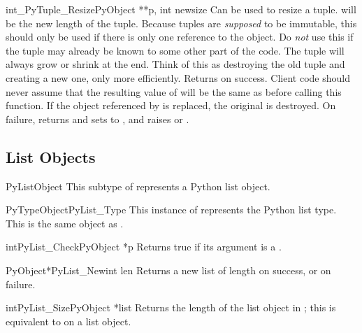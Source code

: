 \begin{cfuncdesc}{int}{_PyTuple_Resize}{PyObject **p, int newsize}
  Can be used to resize a tuple.   will be the new length
  of the tuple.  Because tuples are \emph{supposed} to be immutable,
  this should only be used if there is only one reference to the
  object.  Do \emph{not} use this if the tuple may already be known to
  some other part of the code.  The tuple will always grow or shrink
  at the end.  Think of this as destroying the old tuple and creating
  a new one, only more efficiently.  Returns  on success.
  Client code should never assume that the resulting value of
   will be the same as before calling this function.
  If the object referenced by  is replaced, the
  original  is destroyed.  On failure, returns
   and sets  to \NULL, and raises
   or
  .
\end{cfuncdesc}


\subsection{List Objects \label{listObjects}}

\begin{ctypedesc}{PyListObject}
  This subtype of  represents a Python list object.
\end{ctypedesc}

\begin{cvardesc}{PyTypeObject}{PyList_Type}
  This instance of  represents the Python list
  type.  This is the same object as .
\end{cvardesc}

\begin{cfuncdesc}{int}{PyList_Check}{PyObject *p}
  Returns true if its argument is a .
\end{cfuncdesc}

\begin{cfuncdesc}{PyObject*}{PyList_New}{int len}
  Returns a new list of length  on success, or \NULL{} on
  failure.
\end{cfuncdesc}

\begin{cfuncdesc}{int}{PyList_Size}{PyObject *list}
  Returns the length of the list object in ; this is
  equivalent to  on a list object.
\end{cfuncdesc}

